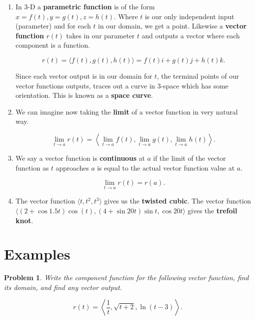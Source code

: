 \documentclass[11pt]{article}
\newtheorem{problem}{Problem}
\begin{document}
\begin{enumerate}
\item  In 3-D a \textbf{parametric function} is of the form $x= f(t), y=g(t), z=h(t)$. Where $t$ is our only independent input (parameter) and for each $t$ in our domain, we get a point. Likewise a \textbf{vector function} $r(t)$ takes in our parameter $t$ and outputs a vector where each component is a function. 

\begin{equation*}
    r(t) = \langle f(t), g(t), h(t) \rangle = f(t)i+g(t)j+h(t)k.
\end{equation*}

Since each vector output is in our domain for $t$, the terminal points of our vector functions outputs, traces out a curve in 3-space which has some orientation. This is known as a \textbf{space curve}.

\item We can imagine now taking the \textbf{limit} of a vector function in very natural way.

\begin{equation*}
    \lim_{t\to a}r(t) = \left\langle \lim_{t\to a}f(t), \lim_{t\to a}g(t), \lim_{t\to a}h(t) \right\rangle.
\end{equation*}


\item We say a vector function is \textbf{continuous} at $a$ if the limit of the vector function as $t$ approaches $a$ is equal to the actual vector function value at $a$. 

\begin{equation*}
    \lim_{t \to a}r(t) = r(a).
\end{equation*}
   

\item The vector function $\langle t,t^2,t^3 \rangle$ gives us the \textbf{twisted cubic}. The vector function $\langle (2+\cos{1.5t})\cos(t),(4+\sin{20t})\sin{t}, \cos{20t} \rangle$ gives the \textbf{trefoil knot}.
   
   
   \end{enumerate}



\section{Examples}

\begin{problem}
    Write the component function for the following vector function, find its domain, and find any vector output.

    \begin{equation*}
        r(t) = \left\langle \frac{1}{t}, \sqrt{t+2}, \ln(t-3) \right\rangle.
    \end{equation*}
\end{problem}
\end{document}
